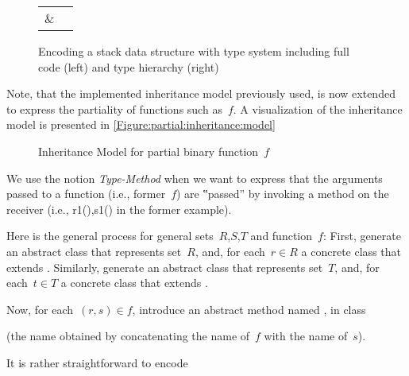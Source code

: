 \begin{figure}[h]
    \caption{Encoding a stack data structure with
    \Java type system including full code (left) and type hierarchy (right)}\label{Figure:stack:encoding}
    \begin{tabular}{cc}
         \parbox[c]{0.74\linewidth}{
      }
        &
         \parbox[c]{\hsize}{
          
        }
    \end{tabular}
\end{figure}
      Note, that the implemented inheritance model previously used, is now extended to express the partiality
        of functions such as~$f$. A visualization of the inheritance model is presented in \cref{Figure:partial:inheritance:model}

\begin{figure}[ht]
  \label{Figure:partial:inheritence:model}
  \caption{Inheritance Model for partial binary function~$f$}
  \begin{adjustbox}{max width=0.6\linewidth}
    
  \end{adjustbox}
\end{figure}

We use the notion \emph{Type-Method} when we want to express that the arguments passed to a function
  (i.e., former~$f$) are ‟passed” by invoking a method on the receiver (i.e., r1(),s1() in the former example).

Here is the general process for general sets~$R$,$S$,$T$ and function~$f$:
First, generate an abstract class  that represents set~$R$, and,
  for each~$r∈R$ a concrete class  that extends .
Similarly, generate an abstract class  that represents set~$T$, and,
  for each~$t∈T$ a concrete class  that extends .

Now, for each~$(r,s)∈f$, introduce an abstract method named ,
  in class~

(the name obtained by
  concatenating the name of~$f$ with the name of~$s$).

It is rather straightforward to encode
